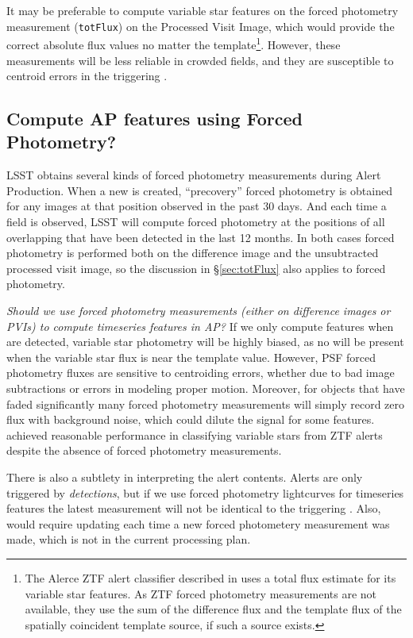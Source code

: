 \documentclass[DM,authoryear,toc]{lsstdoc}
\begin{document}
It may be preferable to compute variable star features on the forced photometry measurement (\texttt{totFlux}) on the Processed Visit Image, which would provide the correct absolute flux values no matter the template\footnote{The Alerce ZTF alert classifier described in \citet{Sanchez-Saez:21:AlertClassification} uses a total flux estimate for its variable star features.  
As ZTF forced photometry measurements are not available, they use the sum of the difference flux and the template flux of the spatially coincident template source, if such a source exists.}. 
However, these measurements will be less reliable in crowded fields, and they are susceptible to centroid errors in the triggering \DIASource.


\subsection{Compute AP features using Forced Photometry?}

LSST obtains several kinds of forced photometry measurements during Alert Production.
When a new \DIAObject is created, ``precovery'' forced photometry is obtained for any images at that position observed in the past 30 days.
And each time a field is observed, LSST will compute forced photometry at the positions of all overlapping \DIAObjects that have been detected in the last 12 months.
In both cases forced photometry is performed both on the difference image and the unsubtracted processed visit image, so the discussion in \S \ref{sec:totFlux} also applies to forced photometry.

\textit{Should we use forced photometry measurements (either on difference images or PVIs) to compute timeseries features in AP?}
If we only compute features when \DIASources are detected, variable star photometry will be highly biased, as no \DIASources will be present when the variable star flux is near the template value.
However, PSF forced photometry fluxes are sensitive to centroiding errors, whether due to bad image subtractions or errors in modeling proper motion.
Moreover, for objects that have faded significantly many forced photometry measurements will simply record zero flux with background noise, which could dilute the signal for some features.
\citet{Sanchez-Saez:21:AlertClassification} achieved reasonable performance in classifying variable stars from ZTF alerts despite the absence of forced photometry measurements.

There is also a subtlety in interpreting the alert contents.
Alerts are only triggered by \DIASource \textit{detections}, but if we use forced photometry lightcurves for timeseries features the latest measurement will not be identical to the triggering \DIASource.
Also, \DIAObjects would require updating each time a new forced photometery measurement was made, which is not in the current processing plan.
\end{document}
